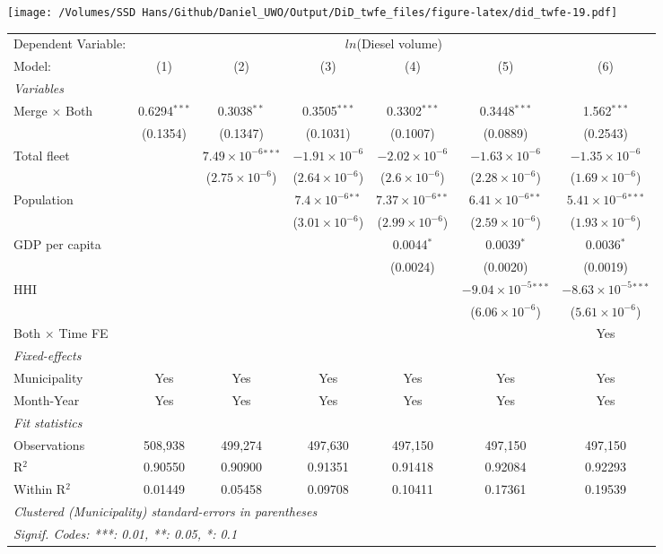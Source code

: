 \documentclass[
]{article}
\begin{document}
\texttt{[image: /Volumes/SSD Hans/Github/Daniel\_UWO/Output/DiD\_twfe\_files/figure-latex/did\_twfe-19.pdf]}

\begin{tabular}{lcccccc}
\tabularnewline\midrule\midrule
Dependent Variable:&\multicolumn{6}{c}{$ln$(Diesel volume)}\\
Model:&(1) & (2) & (3) & (4) & (5) & (6)\\
\midrule \emph{Variables}&   &   &   &   &   &  \\
Merge $\times $ Both & 0.6294$^{***}$ & 0.3038$^{**}$ & 0.3505$^{***}$ & 0.3302$^{***}$ & 0.3448$^{***}$ & 1.562$^{***}$\\
  &(0.1354) & (0.1347) & (0.1031) & (0.1007) & (0.0889) & (0.2543)\\
Total fleet &    & $7.49\times 10^{-6}$$^{***}$ & $-1.91\times 10^{-6}$ & $-2.02\times 10^{-6}$ & $-1.63\times 10^{-6}$ & $-1.35\times 10^{-6}$\\
  &   & ($2.75\times 10^{-6}$) & ($2.64\times 10^{-6}$) & ($2.6\times 10^{-6}$) & ($2.28\times 10^{-6}$) & ($1.69\times 10^{-6}$)\\
Population &    &    & $7.4\times 10^{-6}$$^{**}$ & $7.37\times 10^{-6}$$^{**}$ & $6.41\times 10^{-6}$$^{**}$ & $5.41\times 10^{-6}$$^{***}$\\
  &   &    & ($3.01\times 10^{-6}$) & ($2.99\times 10^{-6}$) & ($2.59\times 10^{-6}$) & ($1.93\times 10^{-6}$)\\
GDP per capita &    &    &    & 0.0044$^{*}$ & 0.0039$^{*}$ & 0.0036$^{*}$\\
  &   &    &    & (0.0024) & (0.0020) & (0.0019)\\
HHI &    &    &    &    & $-9.04\times 10^{-5}$$^{***}$ & $-8.63\times 10^{-5}$$^{***}$\\
  &   &    &    &    & ($6.06\times 10^{-6}$) & ($5.61\times 10^{-6}$)\\
Both $\times$ Time FE &  &  &  &  &  & Yes\\
\midrule \emph{Fixed-effects}&   &   &   &   &   &  \\
Municipality & Yes & Yes & Yes & Yes & Yes & Yes\\
Month-Year & Yes & Yes & Yes & Yes & Yes & Yes\\
\midrule \emph{Fit statistics}&  & & & & & \\
Observations & 508,938&499,274&497,630&497,150&497,150&497,150\\
R$^2$ & 0.90550&0.90900&0.91351&0.91418&0.92084&0.92293\\
Within R$^2$ & 0.01449&0.05458&0.09708&0.10411&0.17361&0.19539\\
\midrule\midrule\multicolumn{7}{l}{\emph{Clustered (Municipality) standard-errors in parentheses}}\\
\multicolumn{7}{l}{\emph{Signif. Codes: ***: 0.01, **: 0.05, *: 0.1}}\\
\end{tabular}
\end{document}
